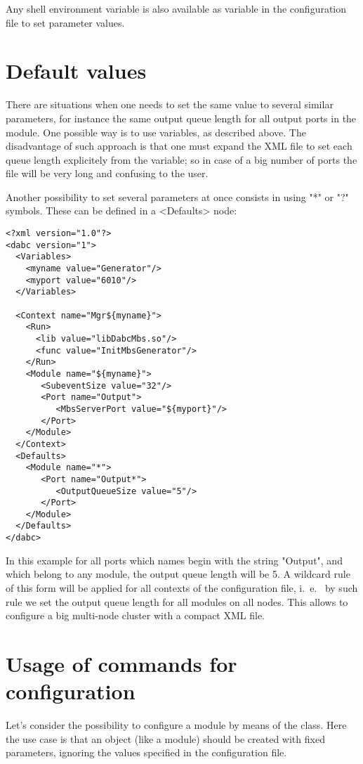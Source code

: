 Any shell environment variable 
is also available as variable in the configuration file to set parameter values. 


\section{Default values}
\label{prog_setup_configfile_defaults}
There are situations when one needs to set the same value to several similar parameters,
for instance the same output queue length for all output ports in the module. One possible way is to use variables, as described above. 
The disadvantage of such approach is that one must expand the XML file
to set each queue length explicitely from the variable;
so in case of a big number of ports the file will be very long and 
confusing to the user.

Another possibility to set several parameters at once 
consists in  using "*" or "?" symbols.
These can be defined in a  <Defaults> node: 

\begin{small}
\begin{verbatim}
<?xml version="1.0"?>
<dabc version="1">
  <Variables>
    <myname value="Generator"/> 
    <myport value="6010"/> 
  </Variables>

  <Context name="Mgr${myname}">
    <Run>
      <lib value="libDabcMbs.so"/>
      <func value="InitMbsGenerator"/>
    </Run>
    <Module name="${myname}">
       <SubeventSize value="32"/>
       <Port name="Output">
          <MbsServerPort value="${myport}"/>
       </Port>
    </Module>
  </Context>
  <Defaults>
    <Module name="*">
       <Port name="Output*">
          <OutputQueueSize value="5"/>
       </Port>
    </Module>
  </Defaults>
</dabc>
\end{verbatim}
\end{small}

In this example for all ports which names begin with the string "Output", 
and which belong to any module, the output queue length will be 5. 
A wildcard rule of this form will be applied for 
all contexts of the configuration file, 
i.~e.~ by such rule we set the output queue length for all modules on all nodes. 
This allows to configure a big multi-node cluster with
a compact XML file.


\section{Usage of commands for configuration}
\label{prog_setup_configuration_commands}
Let's consider the possibility to configure a module by means of the  class.
Here the use case is that
an object (like a module) should be created with fixed parameters,
ignoring the values specified in the configuration file.

